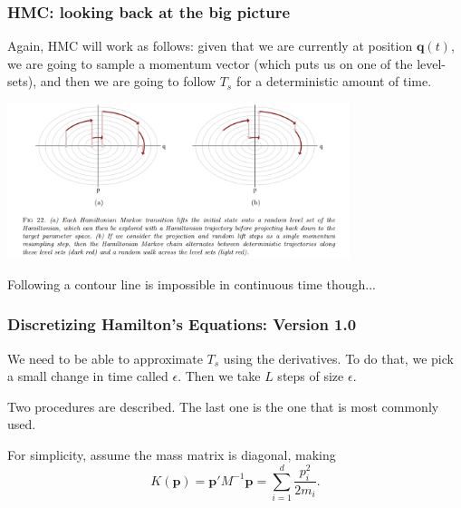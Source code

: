 \documentclass{beamer}
\begin{document}
\begin{frame}
\frametitle{HMC: looking back at the big picture}

Again, HMC will work as follows: given that we are currently at position $\mathbf{q}(t)$, we are going to sample a momentum vector (which puts us on one of the level-sets), and then we are going to follow $T_s$ for a deterministic amount of time.
\newline

\begin{center}
\includegraphics[width=100mm]{1d_algo_vis.png}
\end{center}
\pause

Following a contour line is impossible in continuous time though...
\end{frame}
\begin{frame}
\frametitle{Discretizing Hamilton's Equations: Version 1.0}

We need to be able to approximate $T_s$ using the derivatives. To do that, we pick a small change in time called $\epsilon$. Then we take $L$ steps of size $\epsilon$.
\newline

Two procedures are described. The last one is the one that is most commonly used. 
\newline

For simplicity, assume the mass matrix is diagonal, making
$$
K(\mathbf{p}) = \mathbf{p}'M^{-1}\mathbf{p}  = \sum_{i=1}^d \frac{p_i^2}{2m_i}.
$$


\end{frame}
\end{document}

